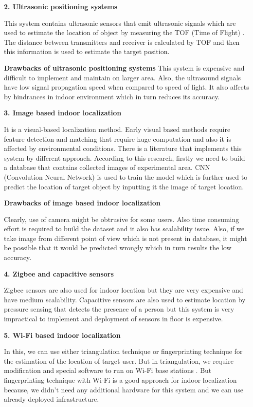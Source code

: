 \textbf{2. Ultrasonic positioning systems}

This system contains ultrasonic sensors that emit ultrasonic signals which are used to estimate the location of object by measuring the TOF (Time of Flight) \cite{UPS}. The distance between transmitters and receiver is calculated by TOF and then this information is used to estimate the target position.

\textbf{Drawbacks of ultrasonic positioning systems}
This system is expensive and difficult to implement and maintain on larger area. Also, the ultrasound signals have low signal propagation speed when compared to speed of light\cite{Sakpere2017ASS}. It also affects by hindrances in indoor environment which in turn reduces its accuracy.

\textbf{3. Image based indoor localization}

It is a visual-based localization method. Early visual based methods require feature detection and matching that require huge computation and also it is affected by environmental conditions. There is a literature that implements this system by different approach. According to this research, firstly we need to build a database that contains collected images of experimental area. CNN (Convolution Neural Network) is used to train the model which is further used to predict the location of target object by inputting it the image of target location.\cite{image}

\textbf{Drawbacks of image based indoor localization}

Clearly, use of camera might be obtrusive for some users. Also time consuming effort is required to build the dataset and it also has scalability issue. Also, if we take image from different point of view which is not present in database, it might be possible that it would be predicted wrongly which in turn results the low accuracy. 

\textbf{4. Zigbee and capacitive sensors}

Zigbee sensors \cite{AAL} are also used for indoor location but they are very expensive and have medium scalability. Capacitive sensors \cite{AAL} are also used to estimate location by pressure sensing that detects the presence of a person but this system is very impractical to implement and deployment of sensors in floor is expensive.

\textbf{5. Wi-Fi based indoor localization}

In this, we can use either triangulation technique or fingerprinting technique for the estimation of the location of target user. But in triangulation, we require modification and special software to run on Wi-Fi base stations \cite{AAL}. But fingerprinting technique with Wi-Fi is a good approach for indoor localization because, we didn’t need any additional hardware for this system and we can use already deployed infrastructure. 

